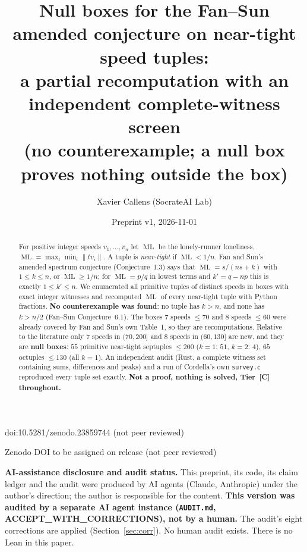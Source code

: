 \documentclass[10pt]{article}
\title{Null boxes for the Fan--Sun amended conjecture on near-tight speed tuples:\\
a partial recomputation with an independent complete-witness screen\\
{\large (no counterexample; a null box proves nothing outside the box)}}
\author{Xavier Callens (SocrateAI Lab)}
\date{Preprint v1, 2026-11-01}
\newcommand{\tier}[1]{\textsf{[#1]}}
\newcommand{\tC}{\tier{C}}
\newcommand{\ML}{\operatorname{ML}}
\begin{document}
\maketitle
\begin{center}\small doi:10.5281/zenodo.23859744 \quad (not peer reviewed)\end{center}

\begin{center}\small Zenodo DOI to be assigned on release \quad (not peer reviewed)\end{center}

\noindent\textbf{AI-assistance disclosure and audit status.} This preprint, its code, its claim ledger and the audit were produced by AI agents (Claude, Anthropic) under the author's direction; the author is responsible for the content.
\textbf{This version was audited by a separate AI agent instance (\texttt{AUDIT.md}, ACCEPT\_WITH\_CORRECTIONS), not by a human.} The audit's eight corrections are applied (Section~\ref{sec:corr}). No human audit exists. There is no Lean in this paper.

\begin{abstract}
\noindent For positive integer speeds $v_1,\dots,v_n$ let $\ML$ be the lonely-runner loneliness, $\ML=\max_t\min_i\|tv_i\|$. A tuple is \emph{near-tight} if $\ML<1/n$. Fan and Sun's amended spectrum conjecture (Conjecture~1.3) says that $\ML=s/(ns+k)$ with $1\le k\le n$, or $\ML\ge1/n$; for $\ML=p/q$ in lowest terms and $k'=q-np$ this is exactly $1\le k'\le n$. We enumerated all primitive tuples of distinct speeds in boxes with exact integer witnesses and recomputed $\ML$ of every near-tight tuple with Python fractions. \textbf{No counterexample was found}: no tuple has $k>n$, and none has $k>n/2$ (Fan--Sun Conjecture~6.1). The boxes $7$ speeds $\le70$ and $8$ speeds $\le60$ were already covered by Fan and Sun's own Table~1, so they are recomputations. Relative to the literature only $7$ speeds in $(70,200]$ and $8$ speeds in $(60,130]$ are new, and they are \textbf{null boxes}: $55$ primitive near-tight septuples $\le200$ ($k=1$: $51$, $k=2$: $4$), $65$ octuples $\le130$ (all $k=1$). An independent audit (Rust, a complete witness set containing sums, differences and peaks) and a run of Cordella's own \texttt{survey.c} reproduced every tuple set exactly. \textbf{Not a proof, nothing is solved, Tier~\tC{} throughout.}
\end{abstract}

\noindent{}
\end{document}
